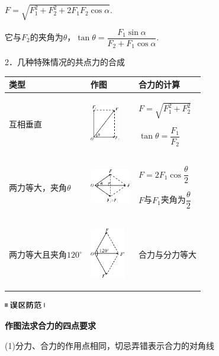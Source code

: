 $F=\sqrt{F_1^2+F_2^2+2F_1F_2\cos\alpha}$.

它与$F_2$的夹角为$\theta$，$\tan \theta=\dfrac{F_1\sin\alpha}{F_2+F_1\cos\alpha}$.

2．几种特殊情况的共点力的合成

\begin{longtable}[]{@{}m{4cm}m{3cm}m{3cm}@{}}
\toprule
类型 & 作图 & 合力的计算\tabularnewline
\midrule
\endhead

互相垂直& \begin{center}\includegraphics[width=0.5in]{media/image65.png}\end{center}&
$F=\sqrt{F_1^2+F_2^2}$

$\tan\theta=\dfrac{F_1}{F_2}$\tabularnewline

两力等大，夹角$\theta$ &
\begin{center}\includegraphics[width=0.7in,]{media/image66.png}\end{center}
&
$F=2F_1\cos\dfrac{\theta}{2}$

$F$与$F_1$夹角为$\dfrac{\theta}{2}$\tabularnewline
两力等大且夹角$120^\circ$ &
\begin{center}
	\includegraphics[width=0.6in]{media/image67.png}
\end{center}
 &
合力与分力等大\tabularnewline
\bottomrule
\end{longtable}

\begin{center}\includegraphics[width=0.70833in,height=0.125in]{media/image34.png}

\textbf{作图法求合力的四点要求}
\end{center}


(1)分力、合力的作用点相同，切忌弄错表示合力的对角线

